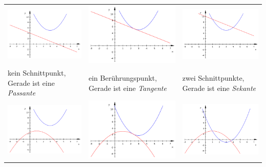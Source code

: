 \documentclass[a4paper, twoside, parskip, 10pt, smallheadings]{scrbook}
\theoremstyle{plain}
\theoremstyle{definition}
\begin{document}
\begin{center}
\begin{tabular}{|p{4.5cm}p{4.5cm}p{4.5cm}|} \hline 
\includegraphics[width=4.5cm]{2te/quadratischefunktion/bilder/schnittparabel04.png}  & 
\includegraphics[width=4.5cm]{2te/quadratischefunktion/bilder/schnittparabel05.png}  & 
\includegraphics[width=4.5cm]{2te/quadratischefunktion/bilder/schnittparabel06.png}  \\
kein Schnittpunkt, Gerade ist eine {\it Passante} & ein Berührungspunkt, Gerade ist eine {\it Tangente} & zwei Schnittpunkte, Gerade ist eine {\it Sekante} \\
\includegraphics[width=4.5cm]{2te/quadratischefunktion/bilder/schnittparabel01.png}  & 
\includegraphics[width=4.5cm]{2te/quadratischefunktion/bilder/schnittparabel02.png}  & 
\includegraphics[width=4.5cm]{2te/quadratischefunktion/bilder/schnittparabel03.png}  \\ \hline 
\end{tabular}
\end{center}
\end{document}
